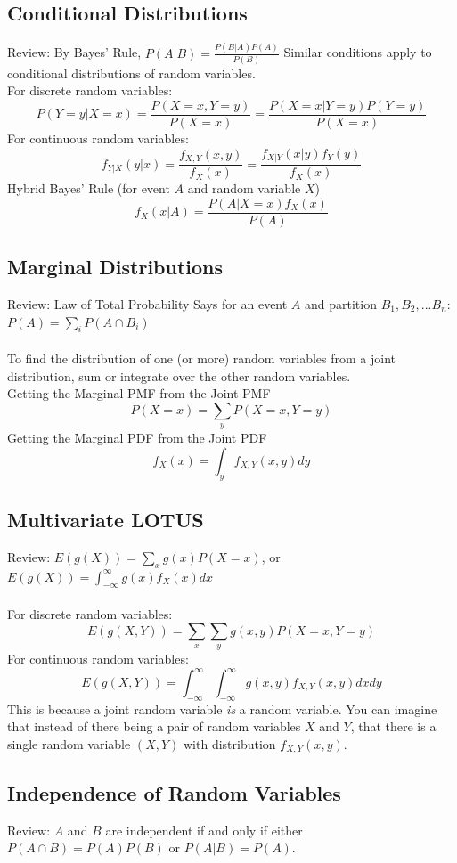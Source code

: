 \documentclass[11pt]{article}
\theoremstyle{definition}
\theoremstyle{remark}
\begin{document}
\subsection{Conditional Distributions}
Review: By Bayes' Rule, $P(A|B) = \frac{P(B|A)P(A)}{P(B)}$ Similar conditions apply to conditional distributions of random variables.\\

For discrete random variables:
\[P(Y=y|X=x) = \frac{P(X=x, Y=y)}{P(X=x)} = \frac{P(X=x|Y=y)P(Y=y)}{P(X=x)}\]
For continuous random variables:
\[f_{Y|X}(y|x) = \frac{f_{X,Y}(x, y)}{f_X(x)} = \frac{f_{X|Y}(x|y)f_Y(y)}{f_X(x)}\]
Hybrid Bayes' Rule (for event $A$ and random variable $X$)
\[f_X(x|A) = \frac{P(A | X = x)f_X(x)}{P(A)}\]


\subsection{Marginal Distributions}
Review: Law of Total Probability Says for an event $A$ and partition $B_1, B_2, ... B_n$: $P(A) = \sum_i P(A\cap B_i)$ \\ \\
To find the distribution of one (or more) random variables from a joint distribution, sum or integrate over the other random variables. \\

\noindent
Getting the Marginal PMF from the Joint PMF
\[P(X = x) = \sum_y P(X=x, Y=y)\]
Getting the Marginal PDF from the Joint PDF
\[f_X(x) = \int_y f_{X, Y}(x, y) dy\]


\subsection{Multivariate LOTUS}
Review: $E(g(X)) = \sum_xg(x)P(X=x)$, or $E(g(X)) = \int_{-\infty}^{\infty}g(x)f_X(x)dx$\\ \\ 
For discrete random variables:
\[E(g(X, Y)) = \sum_x\sum_yg(x, y)P(X=x, Y=y)\]
For continuous random variables:
\[E(g(X, Y)) = \int_{-\infty}^{\infty}\int_{-\infty}^{\infty}g(x, y)f_{X,Y}(x, y)dxdy\]
This is because a joint random variable \textit{is} a random variable. You can imagine that instead of there being a pair of random variables $X$ and $Y$, that there is a single random variable $(X,Y)$ with distribution $f_{X,Y}(x,y)$. 

\subsection{Independence of Random Variables}
Review: $A$ and $B$ are independent if and only if either $P(A\cap B) = P(A)P(B)$ or $P(A|B) = P(A)$. \\
\end{document}

